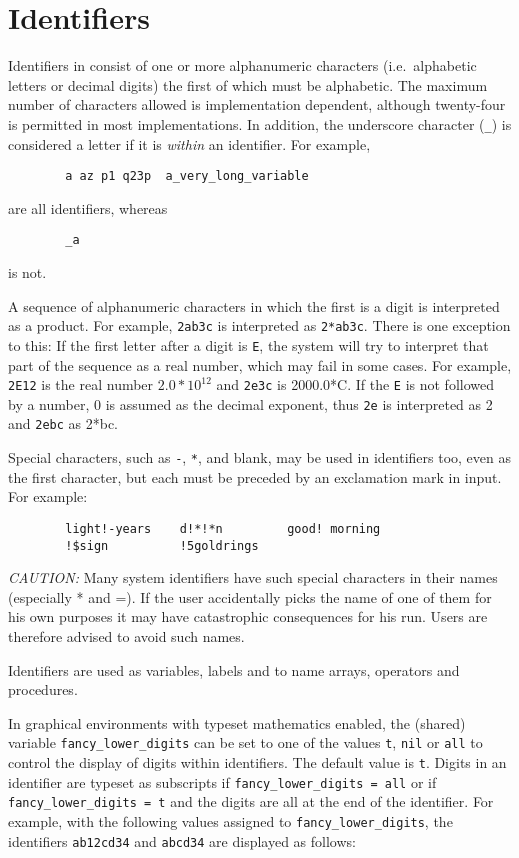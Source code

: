 \section{Identifiers}

Identifiers in {\REDUCE} consist of one or more
alphanumeric characters (i.e.\ alphabetic letters or decimal
digits) the first of which must be alphabetic.  The maximum number of
characters allowed is implementation dependent, although twenty-four is
permitted in most implementations.  In addition, the underscore character
(\texttt{\_}) is considered a letter if it is \emph{within} an identifier.
For example,
\begin{verbatim}
        a az p1 q23p  a_very_long_variable
\end{verbatim}
are all identifiers, whereas
\begin{verbatim}
        _a
\end{verbatim}
is not.

A sequence of alphanumeric characters in which the first is a digit is
interpreted as a product.  For example, \texttt{2ab3c} is interpreted as
\texttt{2*ab3c}.  There is one exception to this:  If the first letter after a
digit is \texttt{E}, the system will try to interpret that part of the
sequence as a real number, which may fail in some cases.  For
example, \texttt{2E12} is the real number $2.0*10^{12}$ and \texttt{2e3c} is
2000.0*C. If the \texttt{E} is not followed by a number, 0 is assumed as the
decimal exponent, thus \texttt{2e} is interpreted as 2 and \texttt{2ebc} as
2*bc.

Special characters, such as \texttt{-}, \texttt{*}, and blank, may be
used in identifiers
too, even as the first character, but each must be preceded by an
exclamation mark in input.  For example:
\begin{verbatim}
        light!-years    d!*!*n         good! morning
        !$sign          !5goldrings
\end{verbatim}
\textit{CAUTION:} Many system identifiers have such special characters in their
names (especially * and =). If the user accidentally picks the name of one
of them for his own purposes it may have catastrophic consequences for his
{\REDUCE} run.  Users are therefore advised to avoid such names.

Identifiers are used as variables, labels and to name arrays, operators
and procedures.

In graphical environments with typeset mathematics enabled, the
(shared) variable
\texttt{fancy\_lower\_digits} can be set
to one of the values \texttt{t}, \texttt{nil} or \texttt{all} to
control the display of digits within identifiers.  The default value
is \texttt{t}.  Digits in an identifier are typeset as subscripts if
\texttt{fancy\_lower\_digits~=~all} or if
\texttt{fancy\_lower\_digits~=~t} and the digits are all at the end of
the identifier.  For example, with the following values assigned to
\texttt{fancy\_lower\_digits}, the identifiers \texttt{ab12cd34} and
\texttt{abcd34} are displayed as follows:

